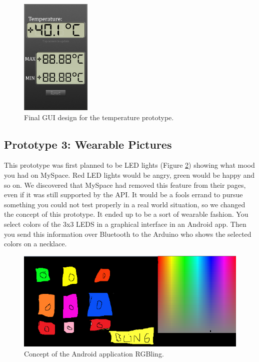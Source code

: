 \begin{figure}[H]
\centering 
\includegraphics[width=0.3\textwidth]{img/prototype2-gui.png}
\caption{Final GUI design for the temperature prototype.}
\label{fig:prototype2-gui}
\end{figure}

	
\subsection{Prototype 3: Wearable Pictures}
This prototype was first planned to be LED lights (Figure \ref{fig:design-ledmatrix}) showing what mood you had on MySpace.
Red LED lights would be angry, green would be happy and so on. We discovered that MySpace had removed this feature from their pages,
even if it was still supported by the API. It would be a fools errand to pursue something you could not test properly
in a real world situation, so we changed the concept of this prototype. It ended up to be a sort of wearable fashion.
You select colors of the 3x3 LEDS in a graphical interface in an Android app. Then you send this information over Bluetooth
to the Arduino who shows the selected colors on a necklace.

\begin{figure}
	\begin{center}
	\includegraphics[scale=0.7]{img/prototype3rgBling.png}
	\end{center}
	\caption{Concept of the Android application RGBling.}
	\label{fig:design-ledmatrix}
\end{figure}

